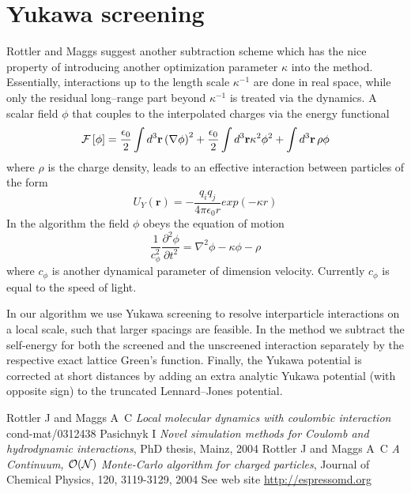 \documentclass[a4paper, 12pt]{article}
\newcommand{\vect}[1]{\mathbf{#1}}
\begin{document}
\section{Yukawa screening}
%
Rottler and Maggs \cite{maggs_prl_2} suggest another subtraction
scheme which has the nice property of introducing another optimization
parameter $\kappa$ into the method. Essentially, interactions up to
the length scale $\kappa^{-1}$ are done in real space, while only the
residual long--range part beyond $\kappa^{-1}$ is treated via the
dynamics. A scalar field $\phi$ that couples to the interpolated charges via the energy functional
%
\begin{equation}
{\cal F}\left[\phi\right]= \frac{\epsilon_0}{2} \int d^3 \vect r\left( \vect{\nabla} \phi \right)^2
+ \frac{\epsilon_0}{2} \int d^3 \vect r \kappa^2 \phi^2 + \int d^3 \vect r \, \rho \phi
\end{equation}
%
where $\rho$ is the charge density, leads to an effective interaction between particles of the form
%
\begin{equation}
  U_Y(\vect r)=-\frac{q_iq_j}{4\pi\epsilon_0 r}exp(-\kappa r)
\end{equation}
%
In the algorithm the field $\phi$ obeys the equation of motion
%
\begin{equation}
  \frac{1}{c_{\phi}^2}\frac{\partial^2\phi}{\partial t^2}=\nabla^2\phi-\kappa\phi-\rho
\end{equation}
%
where $c_{\phi}$ is another dynamical parameter of dimension velocity. Currently $c_{\phi}$ is equal to the speed of light. 

In our algorithm we use Yukawa screening to resolve interparticle
interactions on a local scale, such that larger spacings are
feasible. In the method we subtract the self-energy for both the
screened and the unscreened interaction separately by the respective
exact lattice Green's function.  Finally, the Yukawa potential is
corrected at short distances by adding an extra analytic Yukawa
potential (with opposite sign) to the truncated Lennard--Jones
potential.

\begin{thebibliography}{10}

Rottler J and Maggs A~C \emph{Local molecular dynamics with coulombic
  interaction} cond-mat/0312438
Pasichnyk I \emph{Novel simulation methods for Coulomb and hydrodynamic interactions}, PhD thesis, Mainz, 2004
Rottler J and Maggs A~C \emph{A Continuum, {$\cal O(N)$} Monte-Carlo algorithm for charged particles}, Journal of Chemical Physics, 120, 3119-3129, 2004
See web site \url{http://espressomd.org}
\end{thebibliography}
\end{document}
